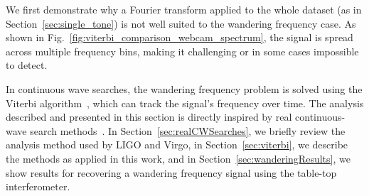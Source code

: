 \documentclass[paper-main.tex]{subfiles}
\begin{document}
We first demonstrate why a Fourier transform applied to the whole dataset (as in Section~\ref{sec:single_tone}) is not well suited to the wandering frequency case.
As shown in Fig.~\ref{fig:viterbi_comparison_webcam_spectrum}, the signal is spread across multiple frequency bins, making it challenging or in some cases impossible to detect.

In continuous wave searches, the wandering frequency problem is solved using the Viterbi algorithm~\cite{Viterbi:1967}, which can track the signal's frequency over time.
The analysis described and presented in this section is directly inspired by real continuous-wave search methods~\cite{SuvorovaEtAl:2016,SuvorovaEtAl:2017}. 
In Section~\ref{sec:realCWSearches}, we briefly review the analysis method used by LIGO and Virgo, in Section~\ref{sec:viterbi}, we describe the methods as applied in this work, and in Section~\ref{sec:wanderingResults}, we show results for recovering a wandering frequency signal using the table-top interferometer. 
\end{document}
